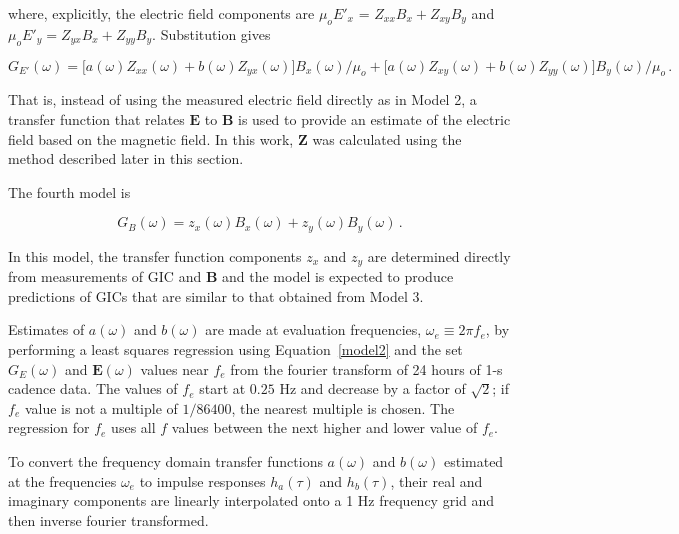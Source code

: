\documentclass[draft,linenumbers]{agujournal2018}
\begin{document}
\noindent
where, explicitly, the electric field components are $\mu_oE'_x$ = $Z_{xx}B_x + Z_{xy}B_y$ and $\mu_oE'_y = Z_{yx}B_x + Z_{yy}B_y$. Substitution gives

\begin{linenomath*}
\begin{equation*}
G_{E'}(\omega) = \big[a(\omega)Z_{xx}(\omega) + b(\omega)Z_{yx}(\omega) \big] B_x(\omega)/\mu_o + \big[ a(\omega)Z_{xy}(\omega) + b(\omega)Z_{yy}(\omega) \big] B_y(\omega)/\mu_o\,.
\end{equation*}
\end{linenomath*}

That is, instead of using the measured electric field directly as in Model 2, a transfer function that relates $\mathbf{E}$ to $\mathbf{B}$ is used to provide an estimate of the electric field based on the magnetic field. In this work, $\boldsymbol{Z}$ was calculated using the method described later in this section.

The fourth model is

\begin{linenomath*}
\begin{equation}
G_B(\omega) = z_x(\omega)B_x(\omega) + z_y(\omega)B_y(\omega)\,.
\label{model4}
\end{equation}
\end{linenomath*}

\noindent
In this model, the transfer function components $z_x$ and $z_y$ are determined directly from measurements of GIC and $\mathbf{B}$ and the model is expected to produce predictions of GICs that are similar to that obtained from Model 3.

Estimates of $a(\omega)$ and $b(\omega)$ are made at evaluation frequencies, $\omega_e \equiv 2\pi f_e$, by performing a least squares regression using Equation~\ref{model2} and the set $G_E(\omega)$ and $\mathbf{E}(\omega)$ values near $f_e$ from the fourier transform of 24 hours of 1-s cadence data. The values of $f_e$ start at $0.25$ Hz and decrease by a factor of $\sqrt{2}$; if $f_e$ value is not a multiple of $1/86400$, the nearest multiple is chosen. The regression for $f_e$ uses all $f$ values between the next higher and lower value of $f_e$.

To convert the frequency domain transfer functions $a(\omega)$ and $b(\omega)$ estimated at the frequencies $\omega_e$ to impulse responses $h_a(\tau)$ and $h_b(\tau)$, their real and imaginary components are linearly interpolated onto a 1 Hz frequency grid and then inverse fourier transformed.  
\end{document}
